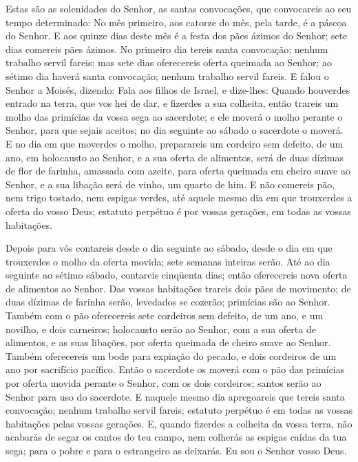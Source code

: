 Estas são as solenidades do Senhor, as santas convocações, que
convocareis ao seu tempo determinado: No mês primeiro, aos
catorze do mês, pela tarde, é a páscoa do Senhor. E aos quinze
dias deste mês é a festa dos pães ázimos do Senhor; sete dias
comereis pães ázimos. No primeiro dia tereis santa convocação;
nenhum trabalho servil fareis; mas sete dias oferecereis oferta
queimada ao Senhor; ao sétimo dia haverá santa convocação; nenhum
trabalho servil fareis. E falou o Senhor a Moisés, dizendo:
Fala aos filhos de Israel, e dize-lhes: Quando houverdes
entrado na terra, que vos hei de dar, e fizerdes a sua colheita,
então trareis um molho das primícias da vossa sega ao sacerdote;
e ele moverá o molho perante o Senhor, para que sejais
aceitos; no dia seguinte ao sábado o sacerdote o moverá. E no
dia em que moverdes o molho, preparareis um cordeiro sem defeito, de
um ano, em holocausto ao Senhor, e a sua oferta de alimentos,
será de duas dízimas de flor de farinha, amassada com azeite, para
oferta queimada em cheiro suave ao Senhor, e a sua libação será de
vinho, um quarto de him. E não comereis pão, nem trigo
tostado, nem espigas verdes, até aquele mesmo dia em que trouxerdes
a oferta do vosso Deus; estatuto perpétuo é por vossas gerações, em
todas as vossas habitações.

Depois para vós contareis desde o dia seguinte ao sábado, desde o
dia em que trouxerdes o molho da oferta movida; sete semanas
inteiras serão. Até ao dia seguinte ao sétimo sábado,
contareis cinqüenta dias; então oferecereis nova oferta de alimentos
ao Senhor. Das vossas habitações trareis dois pães de
movimento; de duas dízimas de farinha serão, levedados se cozerão;
primícias são ao Senhor. Também com o pão oferecereis sete
cordeiros sem defeito, de um ano, e um novilho, e dois carneiros;
holocausto serão ao Senhor, com a sua oferta de alimentos, e as suas
libações, por oferta queimada de cheiro suave ao Senhor.
Também oferecereis um bode para expiação do pecado, e dois
cordeiros de um ano por sacrifício pacífico. Então o
sacerdote os moverá com o pão das primícias por oferta movida
perante o Senhor, com os dois cordeiros; santos serão ao Senhor para
uso do sacerdote. E naquele mesmo dia apregoareis que tereis
santa convocação; nenhum trabalho servil fareis; estatuto perpétuo é
em todas as vossas habitações pelas vossas gerações. E,
quando fizerdes a colheita da vossa terra, não acabarás de segar os
cantos do teu campo, nem colherás as espigas caídas da tua sega;
para o pobre e para o estrangeiro as deixarás. Eu sou o Senhor vosso
Deus.

